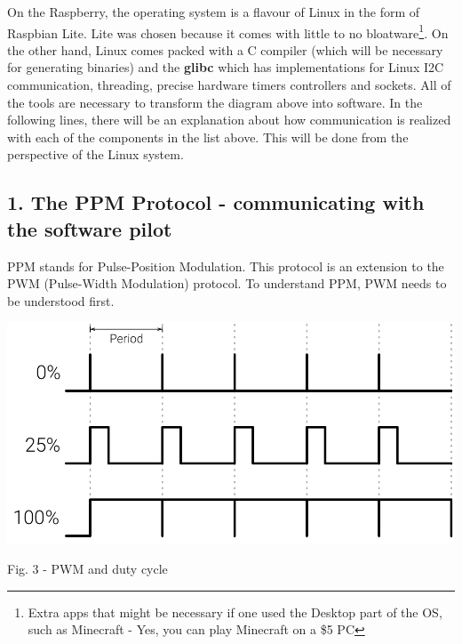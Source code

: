 \documentclass{IEEEtran}
\begin{document}
On the Raspberry, the operating system is a flavour of Linux in the form of Raspbian Lite. Lite was chosen because it comes with little to no bloatware\footnote{Extra apps that might be necessary if one used the Desktop part of the OS, such as Minecraft - Yes, you can play Minecraft on a \$5 PC}.
On the other hand, Linux comes packed with a C compiler (which will be necessary for generating binaries) and the \textbf{glibc} which has implementations for Linux I2C communication, threading, precise hardware timers controllers and sockets. All of the tools are necessary to transform the diagram above into software.
\newline
In the following lines, there will be an explanation about how communication is realized with each of the components in the list above. This will be done from the perspective of the Linux system.
\newline
\subsection*{{1. The PPM Protocol - communicating with the software pilot}}
PPM stands for Pulse-Position Modulation. This protocol is an extension to the PWM (Pulse-Width Modulation) protocol. To understand PPM, PWM needs to be understood first.
\begin{center}\includegraphics[scale=.24]{pwm-duty.png}\end{center}
\begin{it}\begin{center}Fig. 3 - PWM and duty cycle \end{center}\end{it}
\end{document}

